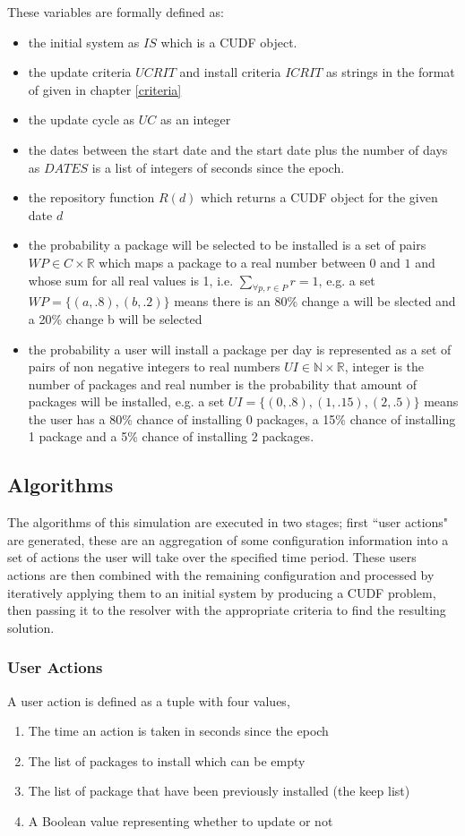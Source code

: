 These variables are formally defined as:
\begin{itemize}
  \item the initial system as $IS$ which is a CUDF object.
  \item the update criteria $UCRIT$ and install criteria $ICRIT$ as strings in the format of given in chapter \ref{criteria}
  \item the update cycle as $UC$ as an integer
  \item the dates between the start date and the start date plus the number of days as $DATES$ is a list of integers of seconds since the epoch.
  \item the repository function $R(d)$ which returns a CUDF object for the given date $d$
  \item the probability a package will be selected to be installed is a set of pairs $WP \in C \times \mathbb{R}$ which maps a package to a real number between $0$ and $1$ 
  and whose sum for all real values is 1, i.e. $\sum_{\forall p,r \in P}r = 1$,
  e.g. a set $WP = \{ (a,.8) , (b,.2)\}$ means there is an 80\% change a will be slected and a 20\% change b will be selected
  \item the probability a user will install a package per day is represented as a set of pairs of non negative integers to real numbers $UI \in \mathbb{N} \times \mathbb{R}$,
  integer is the number of packages and real number is the probability that amount of packages will be installed, 
  e.g.  a set $UI = \{ (0,.8) , (1,.15), (2,.5)\}$ means the user has a 80\% chance of installing 0 packages, a 15\% chance of installing 1 package and a
  5\% chance of installing 2 packages.
\end{itemize} 

\subsection{Algorithms}
The algorithms of this simulation are executed in two stages; 
first ``user actions" are generated, these are an aggregation of some configuration information into a set of actions the user will take over the specified time period.
These users actions are then combined with the remaining configuration and processed by iteratively applying them to an initial system by producing a CUDF problem,
then passing it to the resolver with the appropriate criteria to find the resulting solution.

\subsubsection{User Actions}
A user action is defined as a tuple with four values,
\begin{enumerate}
  \item The time an action is taken in seconds since the epoch
  \item The list of packages to install which can be empty
  \item The list of package that have been previously installed (the keep list)
  \item A Boolean value representing whether to update or not
\end{enumerate}

